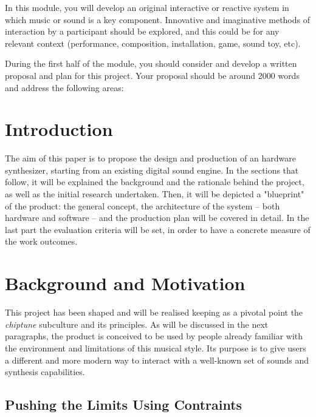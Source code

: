 \documentclass[]{article}
\author{Silvio Gregorini}
\title{}
\date{2019}
\begin{document}
    In this module, you will develop an original interactive or reactive system
 in which music or sound is a key component. Innovative and imaginative
  methods of interaction by a participant should be explored, and this
   could be for any relevant context (performance, composition, installation,
    game, sound toy, etc).
    
During the first half of the module, you should consider and develop a 
written proposal and plan for this project. Your proposal should be around 
2000 words and address the following areas:



\section{Introduction} %

    The aim of this paper is to propose the design and production of an 
    hardware synthesizer, starting from an existing digital sound engine.
    In the sections that follow, it will be explained the background and the rationale 
    behind the project, as well as the initial research undertaken.
    Then, it will be depicted a "blueprint" of the product: the general concept, the 
    architecture of the system -- both hardware and software -- and the production plan 
    will be covered in detail.
    In the last part the evaluation criteria will be set, in order to have a concrete measure
    of the work outcomes.

\section{Background and Motivation}

    This project has been shaped and will be realised keeping as a pivotal point the
    \emph{chiptune} subculture and its principles. As will be discussed in the next paragraphs,
    the product is conceived to be used by people already familiar with the environment and 
    limitations of this musical style. Its purpose is to give users a different and more 
    modern way to interact with a well-known set of sounds and synthesis capabilities.

    \subsection{Pushing the Limits Using Contraints} %
\end{document}
